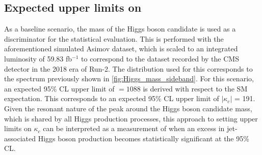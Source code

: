 \subsection{Expected upper limits on \sBR}
\label{sec:ExpectedUpperLimits}
As a baseline scenario, the mass of the Higgs boson candidate is used as a discriminator for the statistical evaluation. This is performed with the aforementioned simulated Asimov dataset, which is scaled to an integrated luminosity of 59.83 fb$^{-1}$ to correspond to the dataset recorded by the CMS detector in the 2018 era of Run-2. The distribution used for this corresponds to the spectrum previously shown in \autoref{fig:Higgs_mass_sideband}. For this scenario, an expected 95\% CL upper limit of \sBR$= 1088$ is derived with respect to the SM expectation. This corresponds to an expected 95\% CL upper limit of $\mid$$\kappa_c$$\mid$ = 191. Given the resonant nature of the peak around the Higgs boson candidate mass, which is shared by all Higgs production processes, this approach to setting upper limits on $\kappa_c$ can be interpreted as a measurement of when an excess in jet-associated Higgs boson production becomes statistically significant at the 95\% CL. \\
\\
